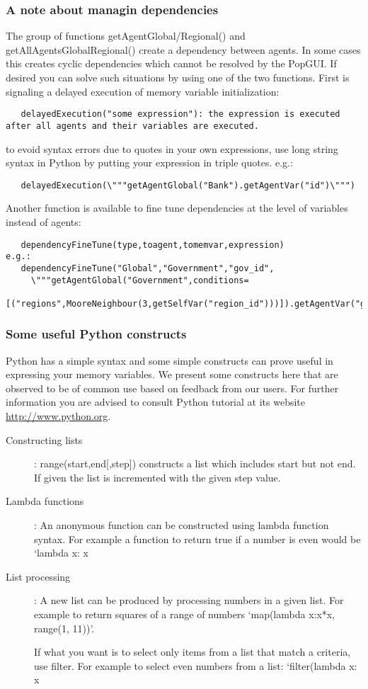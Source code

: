 \documentclass{article}
\begin{document}
\subsubsection{A note about managin dependencies}
 The group of functions getAgentGlobal/Regional() and getAllAgentsGlobalRegional() create a dependency between agents.
 In some cases this creates cyclic dependencies which cannot be resolved by the PopGUI. If desired you can
 solve such situations by using one of the two functions. First is signaling a delayed execution of memory variable initialization:
\begin{verbatim}
   delayedExecution("some expression"): the expression is executed after all agents and their variables are executed. 
\end{verbatim}
 to evoid syntax errors due to quotes in your own expressions, use long string syntax in Python by putting
 your expression in triple quotes. e.g.:
\begin{verbatim}
   delayedExecution(\"""getAgentGlobal("Bank").getAgentVar("id")\""")
\end{verbatim}
 
 Another function is available to fine tune dependencies at the level of variables instead of agents:
\begin{verbatim}
   dependencyFineTune(type,toagent,tomemvar,expression)
e.g.:
   dependencyFineTune("Global","Government","gov_id",
     \"""getAgentGlobal("Government",conditions=
     [("regions",MooreNeighbour(3,getSelfVar("region_id")))]).getAgentVar("gov_id")""")  
\end{verbatim}


\subsubsection{Some useful Python constructs}
Python has a simple syntax and some simple constructs can prove useful in expressing your memory variables. We present some constructs here that are observed to be of common use based on feedback from our users. For further information you are advised to consult Python tutorial at its website \url{http://www.python.org}.
\begin{description}
\item[Constructing lists]: range(start,end[,step]) constructs a list which includes start but not end. If given the list is incremented with the given step value.
\item[Lambda functions]: An anonymous function can be constructed using lambda function syntax. For example a function to return true if a number is even would be `lambda x: x%
\item[List processing]: A new list can be produced by processing numbers in a given list. For example to return squares of a range of numbers `map(lambda x:x*x, range(1, 11))'.

If what you want is to select only items from a list that match a criteria, use filter. For example to select even numbers from a list: `filter(lambda x: x%

\end{description}
\end{document}
